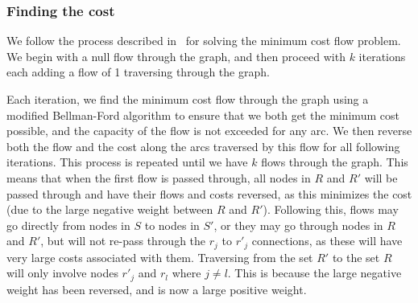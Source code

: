 \subsubsection*{Finding the cost}

We follow the process described in~\cite{mcfp2011} for solving the minimum cost flow problem. We begin with a null flow through the graph, and then proceed with $k$ iterations each adding a flow of 1 traversing through the graph. 

Each iteration, we find the minimum cost flow through the graph using a modified Bellman-Ford algorithm to ensure that we both get the minimum cost possible, and the capacity of the flow is not exceeded for any arc. We then reverse both the flow and the cost along the arcs traversed by this flow for all following iterations. This process is repeated until we have $k$ flows through the graph. This means that when the first flow is passed through, all nodes in $R$ and $R'$ will be passed through and have their flows and costs reversed, as this minimizes the cost (due to the large negative weight between $R$ and $R'$). Following this, flows may go directly from nodes in $S$ to nodes in $S'$, or they may go through nodes in $R$ and $R'$, but will not re-pass through the $r_j$ to $r'_j$ connections, as these will have very large costs associated with them. Traversing from the set $R'$ to the set $R$ will only involve nodes $r'_j$ and $r_l$ where $j \neq l$. This is because the large negative weight has been reversed, and is now a large positive weight.